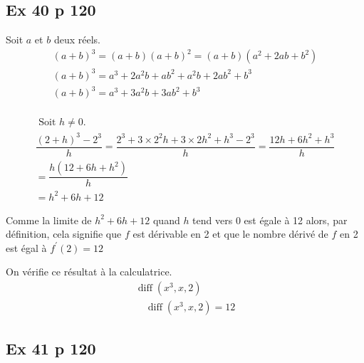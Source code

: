 \documentclass[12pt,a5paper]{book}
\begin{document}
\subsection*{Ex 40 p 120}

\begin{enumMet}
\item Soit $a$ et $b$ deux réels.
$$
\begin{array}{l}
(a+b)^{3}=(a+b)(a+b)^{2}=(a+b)\left(a^{2}+2 a b+b^{2}\right) \\
(a+b)^{3}=a^{3}+2 a^{2} b+a b^{2}+a^{2} b+2 a b^{2}+b^{3} \\
(a+b)^{3}=a^{3}+3 a^{2} b+3 a b^{2}+b^{3} \\
\end{array}
$$
\item $$
\begin{array}{l}
\text { Soit } h \neq 0.\\
\dfrac{(2+h)^{3}-2^{3}}{h}=\dfrac{2^{3}+3 \times 2^{2} h+3 \times 2 h^{2}+h^{3}-2^{3}}{h}=\dfrac{12 h+6 h^{2}+h^{3}}{h} \\
=\dfrac{h\left(12+6 h+h^{2}\right)}{h} \\
=h^{2}+6 h+12
\end{array}
$$
\item Comme la limite de $h^{2}+6 h+12$ quand $h$ tend vers 0 est égale à 12 alors, par définition, cela signifie que $f$ est dérivable en 2 et que le nombre dérivé de $f$ en 2 est égal à $f^{\prime}(2)=12$
\item On vérifie ce résultat à la calculatrice.
$$
\begin{array}{l}
\operatorname{diff}\left(x^{3}, x, 2\right) \\
\quad \operatorname{diff}\left(x^{3}, x, 2\right) = 12
\end{array}
$$
\end{enumMet}

\subsection*{Ex 41 p 120}
\end{document}
